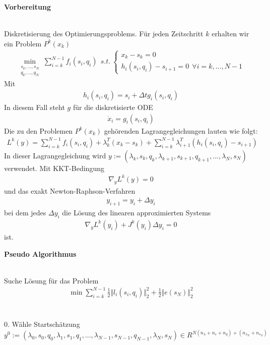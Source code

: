\documentclass[12pt,a4paper]{article}
\begin{document}
  \begin{large}
  \textbf{Vorbereitung}
  \end{large} \\
  Diskretisierung des Optimierungsproblems. Für jeden Zeitschritt $k$ erhalten wir ein Problem $ P^k (x_k) $
  \begin{align*}
  \min_{\begin{array}{c} s_{k},...,s_{N}\\ q_{k},...,q_{N} \end{array}} \sum_{i=k}^{N-1} f_{i}(s_{i},q_{i}) \ \  
  s.t. \ \left\lbrace \begin{array}{c}
  x_{k} - s_{k} = 0 \\
  h_i (s_i ,q_i ) - s_{i+1} = 0 \ \ \forall i = k, ... , N-1 \end{array} \right. 
  \end{align*}
  Mit 
  \begin{align*}
  h_i (s_i ,q_i ) = s_{i} + \Delta t g_{i}(s_{i},q_{i})
  \end{align*}
  In diesem Fall steht $ g $ für die diskretisierte ODE
  \begin{align*}
  \dot{x}_{i} = g_{i} (s_{i},q_{i})
  \end{align*}
  Die zu den Problemen $ P^{k}(x_{k}) $ gehörenden Lagrangegleichungen lauten wie folgt:
  \begin{align*}
  L^{k}(y) = \sum_{i=k}^{N-1} f_{i}(s_{i},q_{i})
  + \lambda_{k}^{T}(x_{k} - s_{k})
  + \sum_{i=k}^{N-1} \lambda_{i+1}^{T} (h_i (s_i ,q_i ) - s_{i+1})
  \end{align*}
  In dieser Lagrangegleichung wird $ y := (\lambda_{k},s_{k},q_{k},\lambda_{k+1},s_{k+1},q_{k+1}, ...,\lambda_{N},s_{N}) $ verwendet.
  Mit KKT-Bedingung
  \begin{align*}
  \nabla_{y} L^{k}(y)  = 0
  \end{align*}
  und das exakt Newton-Raphson-Verfahren
  \begin{align*}
  y_{i+1} = y_i + \Delta y_i
  \end{align*}
  bei dem jedes $ \Delta y_i $ die Lösung des linearen approximierten Systems
  \begin{align*} 
  \nabla_{y} L^{k}(y_{i}) + J^{k}(y_{i}) \Delta y_{i} = 0
  \end{align*}
  ist.\\
  \newpage
  
  \begin{large}
  \textbf{Pseudo Algorithmus}
  \end{large} \\
  Suche Lösung für das Problem
  \begin{align*}
  \min \sum_{i = k}^{N-1}\frac{1}{2}\Vert l_i (s_i , q_i )\Vert_{2}^{2} +\frac{1}{2}\Vert e (s_N )\Vert_{2}^{2}
  \end{align*}\\
  \\
  0. Wähle Startschätzung $ y^{0} := (\lambda_{0},s_{0},q_{0},\lambda_{1},s_{1},q_{1}, ...,\lambda_{N-1},s_{N-1},q_{N-1},\lambda_{N},s_{N})\in R^{N(n_{\lambda}+n_{s}+n_{q})+ (n_{\lambda_N}+n_{s_N})} $\\
  
\end{document}
